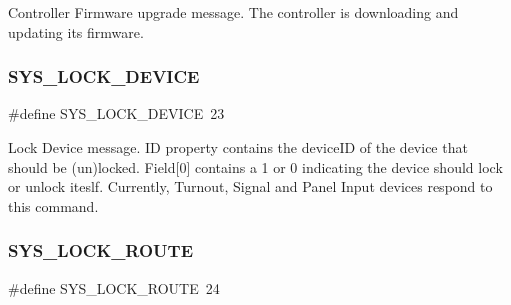 Controller Firmware upgrade message. The controller is downloading and updating its firmware. \mbox{\label{group___u_d_p_message_i_d_ga42644954a92421cfe92c2e3d20f795ce}} 
\subsubsection{\texorpdfstring{S\+Y\+S\+\_\+\+L\+O\+C\+K\+\_\+\+D\+E\+V\+I\+CE}{SYS\_LOCK\_DEVICE}}
{\footnotesize\ttfamily \#define S\+Y\+S\+\_\+\+L\+O\+C\+K\+\_\+\+D\+E\+V\+I\+CE~23}

Lock Device message. ID property contains the device\+ID of the device that should be (un)locked. Field\mbox{[}0\mbox{]} contains a 1 or 0 indicating the device should lock or unlock iteslf. Currently, Turnout, Signal and Panel Input devices respond to this command. \mbox{\label{group___u_d_p_message_i_d_ga9ba07526db57f9ec44d01fe3eba9cc60}} 
\subsubsection{\texorpdfstring{S\+Y\+S\+\_\+\+L\+O\+C\+K\+\_\+\+R\+O\+U\+TE}{SYS\_LOCK\_ROUTE}}
{\footnotesize\ttfamily \#define S\+Y\+S\+\_\+\+L\+O\+C\+K\+\_\+\+R\+O\+U\+TE~24}

